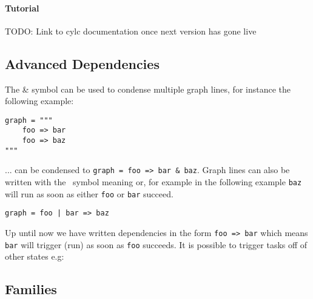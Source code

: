 \paragraph*{Tutorial}

TODO: Link to cylc documentation once next version has gone live


\subsection{Advanced Dependencies}

The \& symbol can be used to condense multiple graph lines, for instance the
following example:

\begin{lstlisting}
graph = """
    foo => bar
    foo => baz
"""
\end{lstlisting}

... can be condensed to \lstinline{graph = foo => bar & baz}.
Graph lines can also be written with the \textbar \, symbol meaning or, for
example in the following example \lstinline{baz} will run as soon as either
\lstinline{foo} or \lstinline{bar} succeed.

\begin{lstlisting}
graph = foo | bar => baz
\end{lstlisting}

Up until now we have written dependencies in the form \lstinline{foo => bar}
which means \lstinline{bar} will trigger (run) as soon as \lstinline{foo}
succeeds. It is possible to trigger tasks off of other states e.g:



\subsection{Families}
\label{Families}

